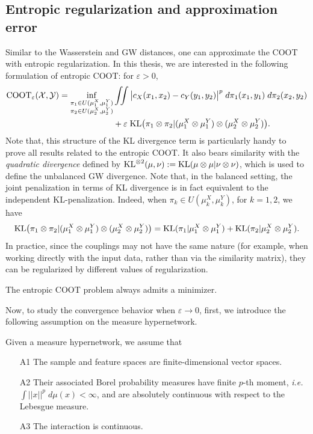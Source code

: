 \subsection{Entropic regularization and approximation error}
Similar to the Wasserstein and GW distances, one can approximate the COOT with entropic regularization.
In this thesis, we are interested in the following formulation of entropic COOT:
for $\varepsilon > 0$,
\begin{align}
  \text{COOT}_{\varepsilon} (\mathcal X, \mathcal Y) =
  \inf_{\substack{\pi_1 \in U(\mu^X_1, \mu^Y_1) \\
  \pi_2 \in U(\mu^X_2, \mu^Y_2)}} &\iint
  \big\vert c_X(x_1, x_2) - c_Y(y_1, y_2) \big\vert^p \; d\pi_1(x_1, y_1) \; d\pi_2(x_2, y_2) \\
  &+ \varepsilon \; \text{KL} \big( \pi_1 \otimes \pi_2 \vert (\mu^X_1 \otimes \mu^Y_1) \otimes (\mu^X_2 \otimes \mu^Y_2) \big).
\end{align}
Note that, this structure of the KL divergence term is particularly handy to prove all results related to
the entropic COOT. It also bears similarity with the \textit{quadratic divergence}
\citep{Sejourne20} defined by $\text{KL}^{\otimes 2}(\mu, \nu):= \text{KL}(\mu \otimes \mu | \nu \otimes \nu)$,
which is used to define the unbalanced GW divergence. Note that, in the balanced setting,
the joint penalization in terms of KL divergence is in fact equivalent to the
independent KL-penalization. Indeed, when $\pi_k \in U(\mu_k^X, \mu_k^Y)$, for $k=1,2$, we have
\begin{equation}
  \text{KL} \big( \pi_1 \otimes \pi_2 \vert (\mu^X_1 \otimes \mu^Y_1) \otimes (\mu^X_2 \otimes \mu^Y_2) \big)
  = \text{KL}(\pi_1 \vert \mu^X_1 \otimes \mu^Y_1) + \text{KL}(\pi_2 \vert \mu^X_2 \otimes \mu^Y_2).
\end{equation}
In practice, since the couplings may not have the same nature (for example,
when working directly with the input data, rather than via the similarity matrix),
they can be regularized by different values of regularization.
\begin{proposition}
The entropic COOT problem always admits a minimizer.
\end{proposition}
Now, to study the convergence behavior when $\varepsilon \to 0$, first,
we introduce the following assumption on the measure hypernetwork.
\begin{assumption}
  \label{assump:ent_coot}
  Given a measure hypernetwork, we assume that
  \begin{enumerate}
    \item[A1] The sample and feature spaces are finite-dimensional vector spaces.
    \item[A2] Their associated Borel probability measures have finite $p$-th moment,
    \textit{i.e.} $\int ||x||^p \; d\mu(x) < \infty$, and are absolutely continuous
    with respect to the Lebesgue measure.
    \item[A3] The interaction is continuous.
  \end{enumerate}
\end{assumption}
